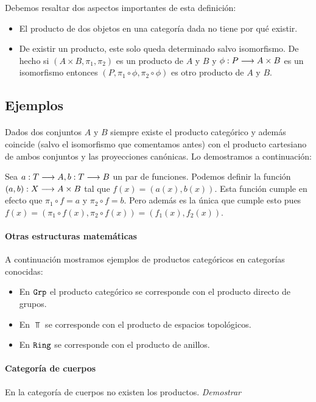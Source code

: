 Debemos resaltar dos aspectos importantes de esta definición:
\begin{itemize}
\item El producto de dos objetos en una categoría dada no tiene por qué
      existir.
\item De existir un producto, este solo queda determinado salvo isomorfismo. De hecho si $(A\times B, \pi_1, \pi_2)$ es un producto de $A$ y $B$
y $\phi : P\longrightarrow A\times B$ es un isomorfismo entonces
$(P, \pi_1 \circ \phi , \pi_2 \circ \phi)$ es otro producto de $A$
y $B$.
\end{itemize}


\subsection{Ejemplos}
\paragraph{\Set}
Dados dos conjuntos $A$ y $B$ siempre existe el producto categórico
y además coincide (salvo el isomorfismo
que comentamos antes) con el producto cartesiano de ambos conjuntos
y las proyecciones canónicas. Lo demostramos a continuación:

Sea $a : T\longrightarrow A, b : T\longrightarrow B$ un par de funciones. Podemos
definir la función $(a, b) : X\longrightarrow A\times B$ tal que
$f(x) = (a(x), b(x))$. Esta función cumple en efecto que
$\pi_1 \circ f = a$ y $\pi_2 \circ f = b$. Pero además es la única
que cumple esto pues
$f(x)=(\pi_1\circ f(x), \pi_2\circ f(x))=(f_1(x), f_2(x))$.

\paragraph{Otras estructuras matemáticas}
A continuación mostramos ejemplos de productos categóricos
en categorías conocidas:

\begin{itemize}
\item En $\texttt{Grp}$ el producto categórico se corresponde con el
producto directo de grupos.
\item En $\Top$ se corresponde con el producto de espacios topológicos.
\item En $\texttt{Ring}$ se corresponde con el producto de anillos.
\end{itemize}

\paragraph{Categoría de cuerpos}
En la categoría de cuerpos no existen los productos.
\textit{Demostrar}

